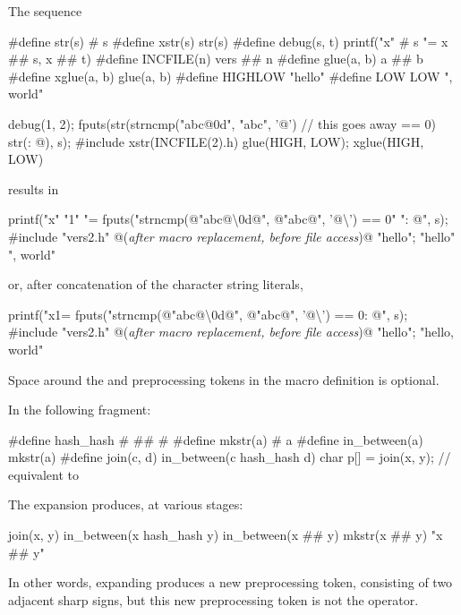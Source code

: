 \pnum
\begin{example}
The sequence
\begin{codeblock}
#define str(s)      # s
#define xstr(s)     str(s)
#define debug(s, t) printf("x" # s "= %
               x ## s, x ## t)
#define INCFILE(n)  vers ## n
#define glue(a, b)  a ## b
#define xglue(a, b) glue(a, b)
#define HIGHLOW     "hello"
#define LOW         LOW ", world"

debug(1, 2);
fputs(str(strncmp("abc@\textbackslash@0d", "abc", '@')        // this goes away
    == 0) str(: @\atsign\textbackslash@n), s);
#include xstr(INCFILE(2).h)
glue(HIGH, LOW);
xglue(HIGH, LOW)
\end{codeblock}
results in
\begin{codeblock}
printf("x" "1" "= %
fputs("strncmp(@\textbackslash@"abc@\textbackslash\textbackslash@0d@\textbackslash@", @\textbackslash@"abc@\textbackslash@", '@\textbackslash{}') == 0" ": @\atsign\textbackslash@n", s);
#include "vers2.h"      @\textrm{(\textit{after macro replacement, before file access})}@
"hello";
"hello" ", world"
\end{codeblock}
or, after concatenation of the character string literals,
\begin{codeblock}
printf("x1= %
fputs("strncmp(@\textbackslash@"abc@\textbackslash\textbackslash@0d@\textbackslash@", @\textbackslash@"abc@\textbackslash@", '@\textbackslash{}') == 0: @\atsign\textbackslash@n", s);
#include "vers2.h"      @\textrm{(\textit{after macro replacement, before file access})}@
"hello";
"hello, world"
\end{codeblock}

Space around the \tcode{\#} and \tcode{\#\#} preprocessing tokens in the macro definition
is optional.
\end{example}

\pnum
\begin{example}
In the following fragment:

\begin{codeblock}
#define hash_hash # ## #
#define mkstr(a) # a
#define in_between(a) mkstr(a)
#define join(c, d) in_between(c hash_hash d)
char p[] = join(x, y);          // equivalent to 
\end{codeblock}

The expansion produces, at various stages:

\begin{codeblock}
join(x, y)
in_between(x hash_hash y)
in_between(x ## y)
mkstr(x ## y)
"x ## y"
\end{codeblock}

In other words, expanding  produces a new preprocessing token,
consisting of two adjacent sharp signs, but this new preprocessing token is not the
\tcode{\#\#} operator.
\end{example}

